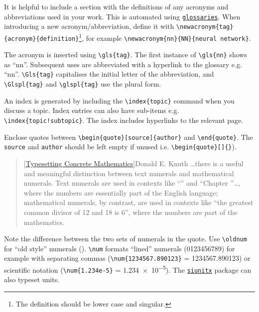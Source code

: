 

It is helpful to include a section with the definitions of any acronyms and abbreviations
used in your work. This is automated using \href{https://ctan.org/pkg/glossaries}{\texttt{glossaries}}.
When introducing a new acronym/abbreviation, define it with \verb|\newacronym{tag}{acronym}{definition}|\footnote{The 
definition should be lower case and singular.}, for example \verb|\newacronym{nn}{NN}{neural network}|.

The acronym is inserted using \verb|\gls{tag}|. The first instance of \verb|\gls{nn}| shows
as ``\gls{nn}''. Subsequent uses are abbreviated with a hyperlink to the glossary e.g. ``\gls{nn}''.
\verb|\Gls{tag}| capitalises the initial letter of the abbreviation, and \verb|\Glspl{tag}|
and \verb|\glspl{tag}| use the plural form.


An index is generated by including the \verb|\index{topic}| command when you discuss a topic.
Index entries can also have sub-items e.g. \verb|\index{topic!subtopic}|. The index includes
hyperlinks to the relevant page.


Enclose quotes between \verb|\begin{quote}[source]{author}| and \verb|\end{quote}|. The
\texttt{source} and \texttt{author} should be left empty if unused i.e. \verb|\begin{quote}[]{}|).

\begin{quote}[\href{https://www.tug.org/TUGboat/Articles/tb10-1/tb23knut.pdf}{Typesetting Concrete Mathematics}]{Donald E. Knuth}
  \dots there is a useful and meaningful distinction between text numerals and mathematical
  numerals. Text numerals are used in contexts like ``'' and ``Chapter ''\dots,
  where the numbers are essentially part of the English language; mathematical numerals, by contrast,
  are used in contexts like ``the greatest common divisor of 12 and 18 is 6'', where the numbers
  are part of the mathematics.
\end{quote}


Note the difference between the two sets of numerals in the quote. Use \verb|\oldnum| for
``old style'' numerals (). \verb|\num| formats ``lined'' numerals (0123456789)
for example with separating commas (\verb|\num{1234567.890123}| = \num{1234567.890123}) or 
scientific notation (\verb|\num{1.234e-5}| = \num{1.234e-5}). The \href{https://ctan.org/pkg/siunitx}{\texttt{siunitx}}
package can also typeset units.

